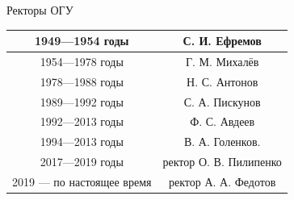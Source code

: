 \documentclass[aspectratio=3218]{beamer}
\begin{document}
\begin{frame}
\begin{figure}[h]
\label{ris:image}
\end{figure}
\end{frame}

\begin{frame}{Ректоры ОГУ}    
\begin{center}
    \begin{tabular}{|c|c|}
    \hline
    1949—1954 годы& С. И. Ефремов\\
    \hline
    1954—1978 годы& Г. М. Михалёв\\
    \hline
    1978—1988 годы& Н. С. Антонов\\
    \hline
    1989—1992 годы& С. А. Пискунов\\  
    \hline
    1992—2013 годы& Ф. С. Авдеев\\
    \hline
    1994—2013 годы&В. А. Голенков.\\
    \hline
    2017—2019 годы& ректор О. В. Пилипенко\\
    \hline
    2019 — по настоящее время& ректор А. А. Федотов\\
    \hline

    \hline
    \end{tabular}
 \end{center}
\end{frame}
\end{document}
